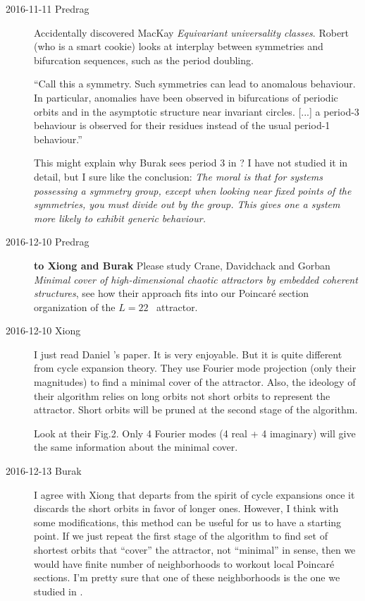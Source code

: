 \begin{description}
\item[2016-11-11 Predrag] Accidentally discovered MacKay
{\em Equivariant universality classes}. Robert (who is a smart cookie)
looks at interplay between symmetries and bifurcation sequences, such as
the period doubling.

``Call this a  symmetry. Such symmetries can lead to
anomalous behaviour. In particular, anomalies have
been observed in bifurcations of periodic orbits
and in the asymptotic structure near invariant circles.
[...]
a period-3 behaviour is observed for their residues
instead of the usual period-1 behaviour.''

This might explain why Burak sees period 3 in ?
I have not studied it in detail, but I sure like the conclusion:
\emph{The moral is that for systems possessing a symmetry
group, except when looking near fixed points of the
symmetries, you must divide out by the group. This
gives one a system more likely to exhibit generic behaviour.}

\item[2016-12-10 Predrag] {\bf to Xiong and Burak}
Please study Crane, Davidchack and Gorban {\em Minimal cover of
high-dimensional chaotic attractors by embedded coherent structures}, see how
their approach fits into our Poincar\'e section organization of the $L=22$
\KS\ attractor.

\item[2016-12-10 Xiong]
I just read Daniel \etal's paper. It is very enjoyable.
But it is quite different from cycle expansion theory.
They use Fourier mode projection (only their
magnitudes) to find a minimal cover of the attractor.
Also, the ideology of their algorithm relies on long orbits not
short orbits to represent the attractor. Short orbits will be pruned
at the second stage of the algorithm.

Look at their Fig.2. Only 4 Fourier modes (4 real + 4 imaginary)
will give the same information about the minimal cover.




\item[2016-12-13 Burak]
I agree with Xiong that  departs from the spirit of
cycle expansions once it discards the short orbits in favor of longer ones.
However, I think with some modifications, this method can be useful for
us to have a starting point. If we just repeat the first stage of the
algorithm to find set of shortest orbits that ``cover'' the attractor,
not ``minimal'' in  sense, then we would have finite number
of neighborhoods to workout local Poincar\'e sections. I'm pretty sure that
one of these neighborhoods is the one we studied in .


\end{description}
